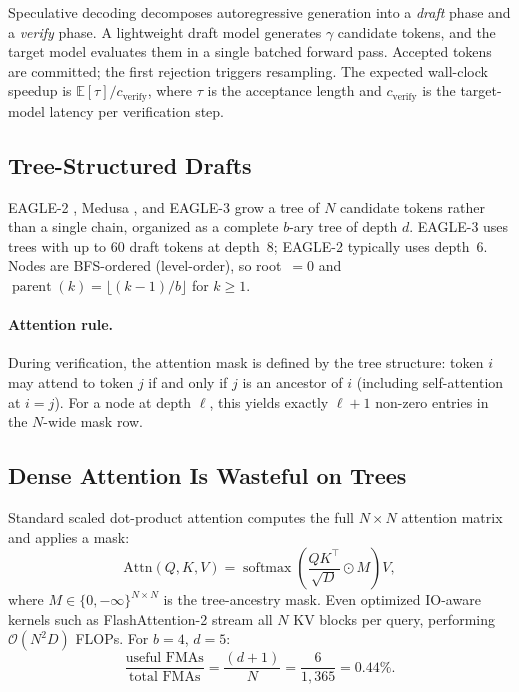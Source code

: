 \documentclass{article}
\newcommand{\bigO}[1]{\mathcal{O}(#1)}
\newcommand{\numtokens}{N}
\newcommand{\depth}{d}
\newcommand{\branching}{b}
\newcommand{\headdim}{D}
\DeclareMathOperator*{\softmax}{softmax}
\DeclareMathOperator{\parent}{parent}
\begin{document}
Speculative decoding \cite{leviathan2023fast, chen2023accelerating, stern2018blockwise}
decomposes autoregressive generation into a \emph{draft} phase and a
\emph{verify} phase.
A lightweight draft model generates $\gamma$ candidate tokens, and the
target model evaluates them in a single batched forward pass.
Accepted tokens are committed; the first rejection triggers resampling.
The expected wall-clock speedup is $\mathbb{E}[\tau] / c_{\text{verify}}$,
where $\tau$ is the acceptance length and $c_{\text{verify}}$ is the
target-model latency per verification step.

\subsection{Tree-Structured Drafts}

EAGLE-2 \cite{li2024eagle2}, Medusa \cite{cai2024medusa}, and
EAGLE-3 \cite{li2025eagle3} grow a tree of $\numtokens$ candidate
tokens rather than a single chain, organized as a complete
$\branching$-ary tree of depth $\depth$.
EAGLE-3 uses trees with up to 60 draft tokens at depth~8;
EAGLE-2 typically uses depth~6.
Nodes are BFS-ordered (level-order), so root~$= 0$ and
$\parent(k) = \lfloor (k - 1) / \branching \rfloor$ for $k \geq 1$.

\paragraph{Attention rule.}
During verification, the attention mask is defined by the tree
structure: token $i$ may attend to token $j$ if and only if
$j$ is an ancestor of $i$ (including self-attention at $i = j$).
For a node at depth $\ell$, this yields exactly $\ell + 1$
non-zero entries in the $N$-wide mask row.

\subsection{Dense Attention Is Wasteful on Trees}

Standard scaled dot-product attention computes the full
$\numtokens \times \numtokens$ attention matrix and applies a mask:
\begin{equation}
  \text{Attn}(Q, K, V) = \softmax\!\left(\frac{QK^\top}{\sqrt{\headdim}}
    \odot M\right) V,
\end{equation}
where $M \in \{0, -\infty\}^{\numtokens \times \numtokens}$ is the
tree-ancestry mask.
Even optimized IO-aware kernels such as FlashAttention-2 stream all
$\numtokens$ KV blocks per query, performing
$\bigO{\numtokens^2 \headdim}$ FLOPs.
For $\branching = 4$, $\depth = 5$:
\[
  \frac{\text{useful FMAs}}{\text{total FMAs}}
  = \frac{(\depth + 1)}{\numtokens}
  = \frac{6}{1{,}365} = 0.44\%.
\]
\end{document}
